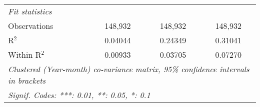 \begin{table}[htbp]
\begin{threeparttable}[b]
\begin{tabular}{lccc}
         \emph{Fit statistics}\\
         Observations                    & 148,932           & 148,932          & 148,932\\  
         R$^2$                           & 0.04044           & 0.24349          & 0.31041\\  
         Within R$^2$                    & 0.00933           & 0.03705          & 0.07270\\  
         \midrule \midrule
         \multicolumn{4}{l}{\emph{Clustered (Year-month) co-variance matrix, 95\% confidence intervals in brackets}}\\
         \multicolumn{4}{l}{\emph{Signif. Codes: ***: 0.01, **: 0.05, *: 0.1}}\\
      \end{tabular}
   \end{threeparttable}
\end{table}



